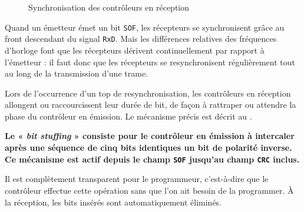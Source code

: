 \begin{figure}[ht]
  \centering
  \caption{Synchronisation des contrôleurs en réception}
\end{figure}

Quand un émetteur émet un bit \texttt{SOF}, les récepteurs se synchronisent grâce au front descendant du signal \texttt{RxD}. Mais les différences relatives des fréquences d'horloge font que les récepteurs dérivent continuellement par rapport à l'émetteur : il faut donc que les récepteurs se resynchronisent régulièrement tout au long de la transmission d'une trame.

Lors de l'occurrence d'un top de resynchronisation, les contrôleurs en réception allongent ou raccourcissent leur durée de bit, de façon à rattraper ou attendre la phase du contrôleur en émission. Le mécanisme précis est décrit au .












{\bf Le « \emph{bit stuffing} » consiste pour le contrôleur en émission à intercaler après une séquence de cinq bits identiques un bit de polarité inverse. Ce mécanisme est actif depuis le champ \texttt{SOF} jusqu'au champ \texttt{CRC} inclus.}

Il est complètement transparent pour le programmeur, c'est-à-dire que le contrôleur effectue cette opération sans que l'on ait besoin de la programmer. À la réception, les bits insérés sont automatiquement éliminés.

